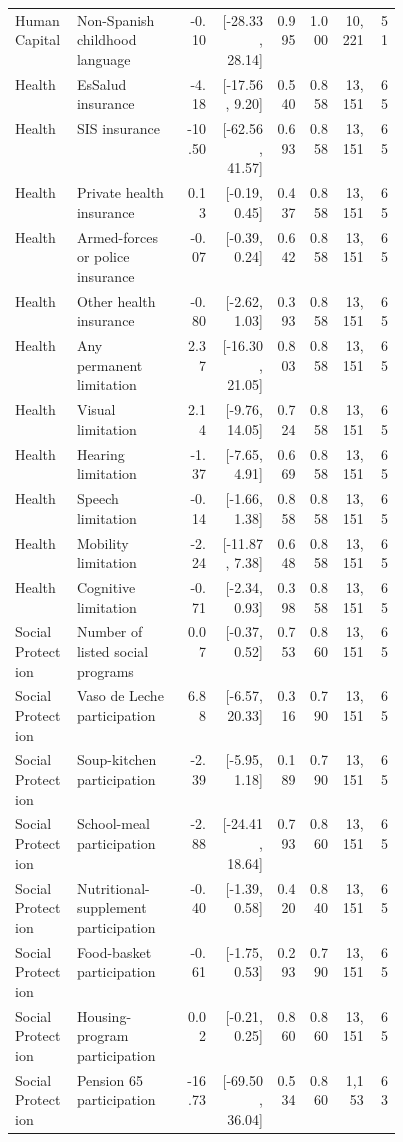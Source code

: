 \begin{longtable}{p{0.16\linewidth}p{0.29\linewidth}rrrrrr}
Human Capital & Non-Spanish childhood language & -0.10 & [-28.33, 28.14] & 0.995 & 1.000 & 10,221 & 51 \\
Health & EsSalud insurance & -4.18 & [-17.56, 9.20] & 0.540 & 0.858 & 13,151 & 65 \\
Health & SIS insurance & -10.50 & [-62.56, 41.57] & 0.693 & 0.858 & 13,151 & 65 \\
Health & Private health insurance & 0.13 & [-0.19, 0.45] & 0.437 & 0.858 & 13,151 & 65 \\
Health & Armed-forces or police insurance & -0.07 & [-0.39, 0.24] & 0.642 & 0.858 & 13,151 & 65 \\
Health & Other health insurance & -0.80 & [-2.62, 1.03] & 0.393 & 0.858 & 13,151 & 65 \\
Health & Any permanent limitation & 2.37 & [-16.30, 21.05] & 0.803 & 0.858 & 13,151 & 65 \\
Health & Visual limitation & 2.14 & [-9.76, 14.05] & 0.724 & 0.858 & 13,151 & 65 \\
Health & Hearing limitation & -1.37 & [-7.65, 4.91] & 0.669 & 0.858 & 13,151 & 65 \\
Health & Speech limitation & -0.14 & [-1.66, 1.38] & 0.858 & 0.858 & 13,151 & 65 \\
Health & Mobility limitation & -2.24 & [-11.87, 7.38] & 0.648 & 0.858 & 13,151 & 65 \\
Health & Cognitive limitation & -0.71 & [-2.34, 0.93] & 0.398 & 0.858 & 13,151 & 65 \\
Social Protection & Number of listed social programs & 0.07 & [-0.37, 0.52] & 0.753 & 0.860 & 13,151 & 65 \\
Social Protection & Vaso de Leche participation & 6.88 & [-6.57, 20.33] & 0.316 & 0.790 & 13,151 & 65 \\
Social Protection & Soup-kitchen participation & -2.39 & [-5.95, 1.18] & 0.189 & 0.790 & 13,151 & 65 \\
Social Protection & School-meal participation & -2.88 & [-24.41, 18.64] & 0.793 & 0.860 & 13,151 & 65 \\
Social Protection & Nutritional-supplement participation & -0.40 & [-1.39, 0.58] & 0.420 & 0.840 & 13,151 & 65 \\
Social Protection & Food-basket participation & -0.61 & [-1.75, 0.53] & 0.293 & 0.790 & 13,151 & 65 \\
Social Protection & Housing-program participation & 0.02 & [-0.21, 0.25] & 0.860 & 0.860 & 13,151 & 65 \\
Social Protection & Pension 65 participation & -16.73 & [-69.50, 36.04] & 0.534 & 0.860 & 1,153 & 63 \\

\end{longtable}
